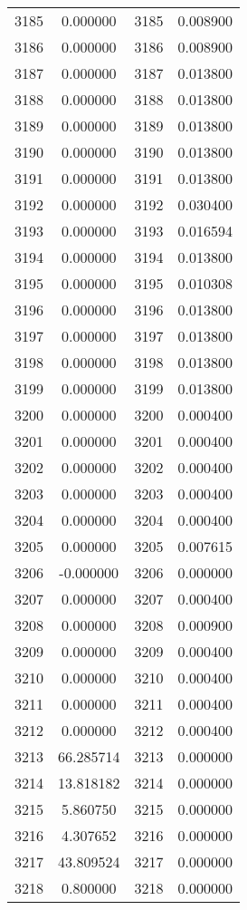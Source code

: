 \documentclass[12pt]{article}
\begin{document}
\begin{longtable}{@{}cccc@{}}
3185 & 0.000000 & 3185 & 0.008900 \\
3186 & 0.000000 & 3186 & 0.008900 \\
3187 & 0.000000 & 3187 & 0.013800 \\
3188 & 0.000000 & 3188 & 0.013800 \\
3189 & 0.000000 & 3189 & 0.013800 \\
3190 & 0.000000 & 3190 & 0.013800 \\
3191 & 0.000000 & 3191 & 0.013800 \\
3192 & 0.000000 & 3192 & 0.030400 \\
3193 & 0.000000 & 3193 & 0.016594 \\
3194 & 0.000000 & 3194 & 0.013800 \\
3195 & 0.000000 & 3195 & 0.010308 \\
3196 & 0.000000 & 3196 & 0.013800 \\
3197 & 0.000000 & 3197 & 0.013800 \\
3198 & 0.000000 & 3198 & 0.013800 \\
3199 & 0.000000 & 3199 & 0.013800 \\
3200 & 0.000000 & 3200 & 0.000400 \\
3201 & 0.000000 & 3201 & 0.000400 \\
3202 & 0.000000 & 3202 & 0.000400 \\
3203 & 0.000000 & 3203 & 0.000400 \\
3204 & 0.000000 & 3204 & 0.000400 \\
3205 & 0.000000 & 3205 & 0.007615 \\
3206 & -0.000000 & 3206 & 0.000000 \\
3207 & 0.000000 & 3207 & 0.000400 \\
3208 & 0.000000 & 3208 & 0.000900 \\
3209 & 0.000000 & 3209 & 0.000400 \\
3210 & 0.000000 & 3210 & 0.000400 \\
3211 & 0.000000 & 3211 & 0.000400 \\
3212 & 0.000000 & 3212 & 0.000400 \\
3213 & 66.285714 & 3213 & 0.000000 \\
3214 & 13.818182 & 3214 & 0.000000 \\
3215 & 5.860750 & 3215 & 0.000000 \\
3216 & 4.307652 & 3216 & 0.000000 \\
3217 & 43.809524 & 3217 & 0.000000 \\
3218 & 0.800000 & 3218 & 0.000000 \\

\end{longtable}
\end{document}
